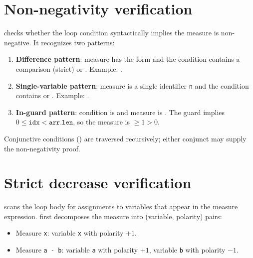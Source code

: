 \section{Non-negativity verification}
\label{sec:term-nonneg}

\pnum
{} checks whether the loop
condition syntactically implies the measure is non-negative.  It recognizes
two patterns:

\begin{enumerate}
\item \textbf{Difference pattern}: measure has the form  and the
  condition contains a comparison  (strict) or .
  Example: .
\item \textbf{Single-variable pattern}: measure is a single identifier \texttt{n}
  and the condition contains  or .
  Example: .
\item \textbf{In-guard pattern}: condition is  and measure
  is .  The  guard implies
  $0 \leq \texttt{idx} < \texttt{arr.len}$, so the measure is $\geq 1 > 0$.
\end{enumerate}

\pnum
Conjunctive conditions () are traversed recursively; either
conjunct may supply the non-negativity proof.

\section{Strict decrease verification}
\label{sec:term-decrease}

\pnum
{} scans the loop body for assignments
to variables that appear in the measure expression.  
first decomposes the measure into (variable, polarity) pairs:
\begin{itemize}
\item Measure \texttt{x}: variable \texttt{x} with polarity $+1$.
\item Measure \texttt{a - b}: variable \texttt{a} with polarity $+1$,
  variable \texttt{b} with polarity $-1$.
\end{itemize}

